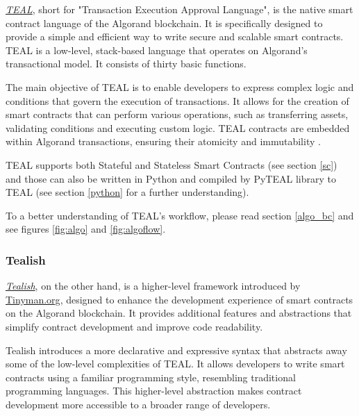 \href{https://developer.algorand.org/docs/get-details/dapps/avm/teal/}{\textit{TEAL}}, short for "Transaction Execution Approval Language", is the native smart contract language of the Algorand blockchain. It is specifically designed to provide a simple and efficient way to write secure and scalable smart contracts. TEAL is a low-level, stack-based language that operates on Algorand's transactional model. It consists of thirty basic functions.\newline

The main objective of TEAL is to enable developers to express complex logic and conditions that govern the execution of transactions. It allows for the creation of smart contracts that can perform various operations, such as transferring assets, validating conditions and executing custom logic. TEAL contracts are embedded within Algorand transactions, ensuring their atomicity and immutability \cite{teal, teal_2}.\newline

TEAL supports both Stateful and Stateless Smart Contracts (see section \ref{sc}) and those can also be written in Python and compiled by PyTEAL library to TEAL (see section \ref{python} for a further understanding).\newline

To a better understanding of TEAL's workflow, please read section \ref{algo_bc} and see figures \ref{fig:algo} and \ref{fig:algoflow}.

\subsubsection{Tealish}

\href{https://github.com/tinymanorg/tealish}{\textit{Tealish}}, on the other hand, is a higher-level framework introduced by \href{https://tinyman.org}{Tinyman.org}, designed to enhance the development experience of smart contracts on the Algorand blockchain. It provides additional features and abstractions that simplify contract development and improve code readability.\newline

Tealish introduces a more declarative and expressive syntax that abstracts away some of the low-level complexities of TEAL. It allows developers to write smart contracts using a familiar programming style, resembling traditional programming languages. This higher-level abstraction makes contract development more accessible to a broader range of developers.\newline

